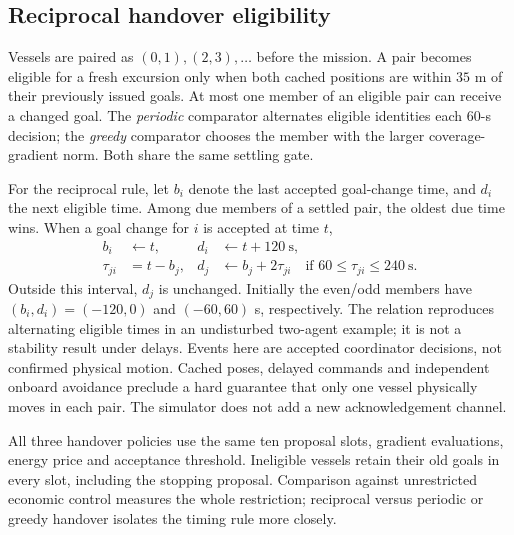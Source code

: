 \subsection{Reciprocal handover eligibility}
Vessels are paired as $(0,1),(2,3),\ldots$ before the mission. A pair becomes
eligible for a fresh excursion only when both cached positions are within
$35$ m of their previously issued goals. At most one member of an eligible pair
can receive a changed goal. The \emph{periodic} comparator alternates eligible
identities each 60-s decision; the \emph{greedy} comparator chooses the member
with the larger coverage-gradient norm. Both share the same settling gate.

For the reciprocal rule, let $b_i$ denote the last accepted goal-change time,
and $d_i$ the next eligible time. Among due members of a settled pair, the oldest
due time wins. When a goal change for $i$ is accepted at time $t$,
\begin{align}
 b_i &\leftarrow t, &d_i&\leftarrow t+120\ \mathrm{s},\\
 \tau_{ji}&=t-b_j, &d_j&\leftarrow b_j+2\tau_{ji}
 \quad\text{if }60\leq\tau_{ji}\leq240\ \mathrm{s}.
\end{align}
Outside this interval, $d_j$ is unchanged. Initially the even/odd members have
$(b_i,d_i)=(-120,0)$ and $(-60,60)$ s, respectively. The relation reproduces
alternating eligible times in an undisturbed two-agent example; it is not a
stability result under delays. Events here are accepted coordinator decisions,
not confirmed physical motion. Cached poses, delayed commands and independent
onboard avoidance preclude a hard guarantee that only one vessel physically
moves in each pair. The simulator does not add a new acknowledgement channel.

All three handover policies use the same ten proposal slots, gradient evaluations,
energy price and acceptance threshold. Ineligible vessels retain their old goals
in every slot, including the stopping proposal. Comparison against unrestricted
economic control measures the whole restriction; reciprocal versus periodic or
greedy handover isolates the timing rule more closely.

